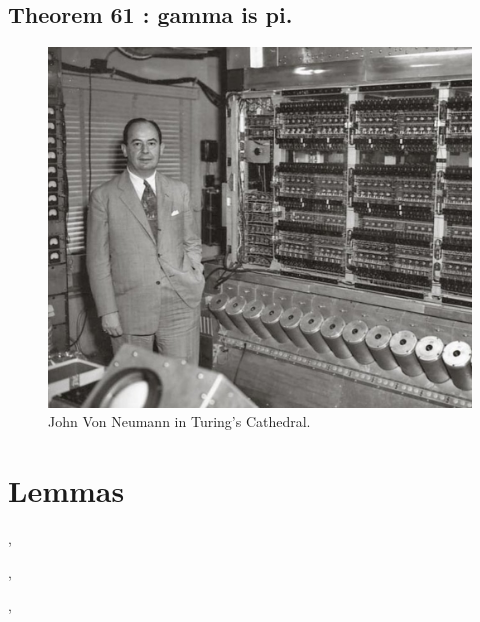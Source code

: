 \documentclass[preview]{standalone}
\begin{document}
\subsection[Gamma is pi.]
    {
        \color{section}Theorem 61 \color{black} : gamma is pi.
    }

\vspace{1\baselineskip}
\begin{figure}[!h]
    \centering
    \includegraphics[width=11.5cm]{../resources/jpg/2.2.set.operations/neumann.jpg}
    \caption*{John Von Neumann in Turing's Cathedral.}
\end{figure}
\pagebreak


\section{Lemmas}
\sep



\sep



\sep
\pagebreak
\end{document}
